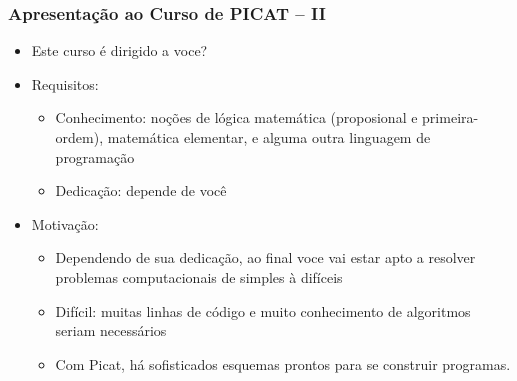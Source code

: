 \begin{frame}[fragile]
  \frametitle{Apresentação ao Curso de PICAT -- II}
  \begin{itemize}

    \item Este curso é dirigido a voce?
  \pause
    \item Requisitos:
   \pause
		\begin{itemize}
			\item Conhecimento: noções de lógica matemática (proposional e primeira-ordem), matemática elementar, 
			e alguma outra linguagem de programação


			\item Dedicação: depende de você
		\end{itemize}
		
  \pause
    \item Motivação:
   \pause
		\begin{itemize}
			\item Dependendo de sua dedicação, ao final voce vai estar apto a resolver problemas
			computacionais de simples à difíceis

			\item Difícil: muitas linhas de código e muito conhecimento de algoritmos seriam
			necessários
			\item Com Picat, há sofisticados esquemas prontos para se construir programas.

		\end{itemize}

  \end{itemize}

\end{frame}


